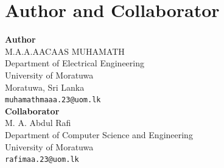 \documentclass[10pt,twocolumn]{article}
\begin{document}
\section*{Author and Collaborator}
\begin{center}
\textbf{Author}\\
M.A.A.AACAAS MUHAMATH\\
Department of Electrical Engineering\\
University of Moratuwa\\
Moratuwa, Sri Lanka\\
\texttt{muhamathmaaa.23@uom.lk}\\[1em]
\textbf{Collaborator}\\
M. A. Abdul Rafi\\
Department of Computer Science and Engineering\\
University of Moratuwa\\
\texttt{rafimaa.23@uom.lk}
\end{center}
\end{document}
